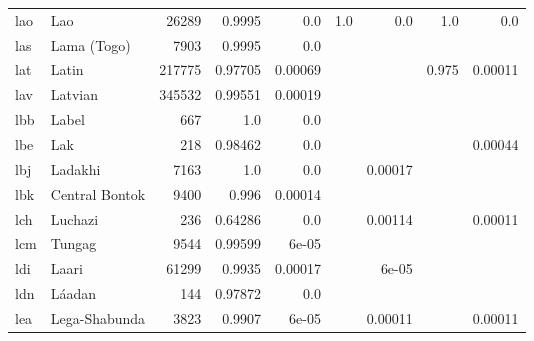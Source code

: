 \documentclass[11pt]{article}
\begin{document}
\begin{table*}[h]
{\begin{tabular}{llrrrrrrr}
lao         & Lao         & 26289         & 0.9995         & 0.0         & 1.0         & 0.0         & 1.0         & 0.0         \\

las         & Lama (Togo)         & 7903         & 0.9995         & 0.0         &          &          &          &          \\

lat         & Latin         & 217775         & 0.97705         & 0.00069         &          &          & 0.975         & 0.00011         \\

lav         & Latvian         & 345532         & 0.99551         & 0.00019         &          &          &          &          \\

lbb         & Label         & 667         & 1.0         & 0.0         &          &          &          &          \\

lbe         & Lak         & 218         & 0.98462         & 0.0         &          &          &          & 0.00044         \\

lbj         & Ladakhi         & 7163         & 1.0         & 0.0         &          & 0.00017         &          &          \\

lbk         & Central Bontok         & 9400         & 0.996         & 0.00014         &          &          &          &          \\

lch         & Luchazi         & 236         & 0.64286         & 0.0         &          & 0.00114         &          & 0.00011         \\

lcm         & Tungag         & 9544         & 0.99599         & 6e-05         &          &          &          &          \\

ldi         & Laari         & 61299         & 0.9935         & 0.00017         &          & 6e-05         &          &          \\

ldn         & Láadan         & 144         & 0.97872         & 0.0         &          &          &          &          \\

lea         & Lega-Shabunda         & 3823         & 0.9907         & 6e-05         &          & 0.00011         &          & 0.00011         \\


\end{tabular}}
\end{table*}
\end{document}
